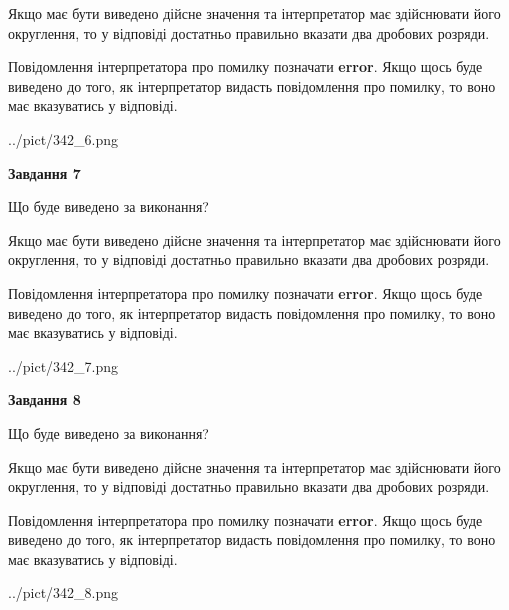 \documentclass[12pt, ukrainian]{article}
\begin{document}
{\begin {Large}
Якщо має бути виведено дійсне значення та інтерпретатор має здійснювати його округлення, 
то у відповіді достатньо правильно вказати два дробових розряди.

Повідомлення інтерпретатора про помилку позначати \textbf{error}.
Якщо щось буде виведено до того, як інтерпретатор видасть повідомлення про помилку, 
то воно має вказуватись у відповіді. \par

\begin{center}
	{../pict/342_6.png}
\end{center}
\newpage

{\begin {center}\textbf{Завдання 7}\end {center}}\par
Що буде виведено за виконання? \par

Якщо має бути виведено дійсне значення та інтерпретатор має здійснювати його округлення, 
то у відповіді достатньо правильно вказати два дробових розряди.

Повідомлення інтерпретатора про помилку позначати \textbf{error}.
Якщо щось буде виведено до того, як інтерпретатор видасть повідомлення про помилку, 
то воно має вказуватись у відповіді. \par

\begin{center}
	{../pict/342_7.png}
\end{center}
\newpage

{\begin {center}\textbf{Завдання 8}\end {center}}\par
Що буде виведено за виконання? \par

Якщо має бути виведено дійсне значення та інтерпретатор має здійснювати його округлення, 
то у відповіді достатньо правильно вказати два дробових розряди.

Повідомлення інтерпретатора про помилку позначати \textbf{error}.
Якщо щось буде виведено до того, як інтерпретатор видасть повідомлення про помилку, 
то воно має вказуватись у відповіді. \par

\begin{center}
	{../pict/342_8.png}
\end{center}
\newpage


\end{Large}}
\end{document}
